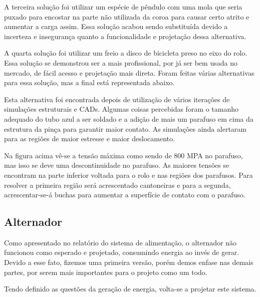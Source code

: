    A terceira solução foi utilizar um espécie de pêndulo com uma mola que seria puxado para encostar na parte não utilizada da coroa para causar certo atrito e aumentar a carga assim. Essa solução acabou sendo substituída devido a incerteza e insegurança quanto a funcionalidade e projetação dessa alternativa.


    A quarta solução foi utilizar um freio a disco de bicicleta preso no eixo do rolo. Essa solução se demonstrou ser a mais profissional, por já ser bem usada no mercado, de fácil acesso e projetação mais direta. Foram feitas várias alternativas para essa solução, mas a final está representada abaixo.


    Esta alternativa foi encontrada depois de utilização de vários iterações de simulações estruturais e CADs. Algumas coisas percebidas foram o tamanho adequado do tubo azul a ser soldado e a adição de mais um parafuso em cima da estrutura da pinça para garantir maior contato.  As simulações ainda alertaram para as regiões de maior estresse e maior deslocamento.


    Na figura acima vê-se a tensão máxima como sendo de 800 MPA no parafuso, mas isso se deve uma descontinuidade no parafuso. As maiores tensões se encontram na parte inferior voltada para o rolo e nas regiões dos parafusos. Para resolver a primeira região será acrescentado cantoneiras e para a segunda, acrescentar-se-á buchas para aumentar a superfície de contato com o parafuso.

\subsection{Alternador}
    Como apresentado no relatório do sistema de alimentação, o alternador não funcionou como esperado e projetado, consumindo energia ao invés de gerar. Devido a esse fato, fizemos uma primeira versão, porém demos enfase nas demais partes, por serem mais importantes para o projeto como um todo.

    
    Tendo definido as questões da geração de energia, volta-se a projetar este sistema.
